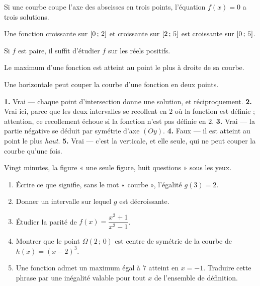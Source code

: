 \begin{vraifaux}
\exo Si une courbe coupe l'axe des abscisses en trois points, l'équation
$f(x) = 0$ a trois solutions.

\exo Une fonction croissante sur $\left[0\,;\,2\right]$ et croissante sur
$\left[2\,;\,5\right]$ est croissante sur $\left[0\,;\,5\right]$.

\exo Si $f$ est paire, il suffit d'étudier $f$ sur les réels positifs.

\exo Le maximum d'une fonction est atteint au point le plus à droite de sa
courbe.

\exo Une horizontale peut couper la courbe d'une fonction en deux points.
\end{vraifaux}

\begin{corrige}
\textbf{1.} Vrai — chaque point d'intersection donne une solution, et
réciproquement.
\textbf{2.} Vrai ici, parce que les deux intervalles se recollent en $2$ où
la fonction est définie ; attention, ce recollement échoue si la fonction
n'est pas définie en $2$.
\textbf{3.} Vrai — la partie négative se déduit par symétrie d'axe $(Oy)$.
\textbf{4.} Faux — il est atteint au point le plus \emph{haut}.
\textbf{5.} Vrai — c'est la verticale, et elle seule, qui ne peut couper la
courbe qu'une fois.
\end{corrige}

\begin{jemeteste}
Vingt minutes, la figure « une seule figure, huit questions » sous les yeux.

\begin{enumerate}[label=\textbf{\arabic*.}, leftmargin=*, itemsep=0.3em]
  \item Écrire ce que signifie, sans le mot « courbe », l'égalité
        $g(3) = 2$.
  \item Donner un intervalle sur lequel $g$ est décroissante.
  \item Étudier la parité de $f(x) = \dfrac{x^{2}+1}{x^{2}-1}$.
  \item Montrer que le point $\Omega(2\,;\,0)$ est centre de symétrie de la
        courbe de $h(x) = (x-2)^{3}$.
  \item Une fonction admet un maximum égal à $7$ atteint en $x = -1$.
        Traduire cette phrase par une inégalité valable pour tout $x$ de
        l'ensemble de définition.
\end{enumerate}
\end{jemeteste}

